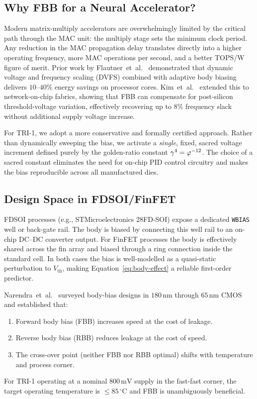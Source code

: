 \subsection{Why FBB for a Neural Accelerator?}
\label{subsec:why-fbb}

Modern matrix-multiply accelerators are overwhelmingly limited by the
critical path through the MAC unit: the multiply stage sets the minimum
clock period.  Any reduction in the MAC propagation delay translates
directly into a higher operating frequency, more MAC operations per second,
and a better TOPS/W figure of merit.  Prior work by
Flautner~et~al.~\cite{FlautnerISCA2002} demonstrated that dynamic voltage
and frequency scaling (DVFS) combined with adaptive body biasing delivers
$10$--$40\%$ energy savings on processor cores.  Kim~et~al.~\cite{KimDAC2002}
extended this to network-on-chip fabrics, showing that FBB can compensate
for post-silicon threshold-voltage variation, effectively recovering up to
$8\%$ frequency slack without additional supply voltage increase.

For TRI-1, we adopt a more conservative and formally certified approach.
Rather than dynamically sweeping the bias, we activate a \emph{single},
fixed, sacred voltage increment defined purely by the golden-ratio constant
$\gamma^{4}{} = \varphi^{-12}{}$.  The choice of a sacred constant eliminates
the need for on-chip PID control circuitry and makes the bias reproducible
across all manufactured dies.

\subsection{Design Space in FDSOI/FinFET}
\label{subsec:design-space}

FDSOI processes (e.g., STMicroelectronics 28FD-SOI) expose a dedicated
\texttt{WBIAS} well or back-gate rail.  The body is biased by connecting
this well rail to an on-chip DC--DC converter output.  For FinFET processes
the body is effectively shared across the fin array and biased through a
ring connection inside the standard cell.  In both cases the bias is
well-modelled as a quasi-static perturbation to $V_{\mathrm{th}}$, making
Equation~\eqref{eq:body-effect} a reliable first-order predictor.

Narendra~et~al.~\cite{NarendraIEEE2003} surveyed body-bias designs in
$180\,\mathrm{nm}$ through $65\,\mathrm{nm}$ CMOS and established that:
\begin{enumerate}
  \item Forward body bias (FBB) increases speed at the cost of leakage.
  \item Reverse body bias (RBB) reduces leakage at the cost of speed.
  \item The cross-over point (neither FBB nor RBB optimal) shifts with
        temperature and process corner.
\end{enumerate}
For TRI-1 operating at a nominal $800\,\mathrm{mV}$ supply in the
fast-fast corner, the target operating temperature is $\leq 85\,^{\circ}$C
and FBB is unambiguously beneficial.

